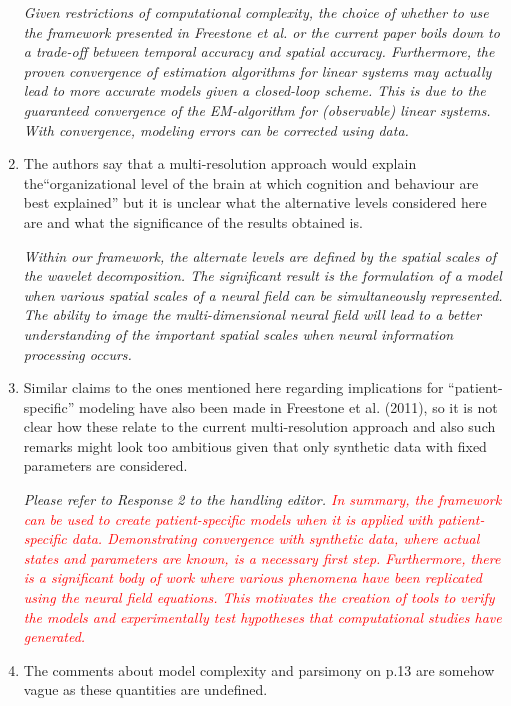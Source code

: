 \documentclass{article}
\newcommand{\dean}[1]{\textcolor{red}{#1}}
\begin{document}
\begin{enumerate}
\emph{Given restrictions of computational complexity, the choice of whether to use the framework presented in Freestone et al. or the current paper boils down to a trade-off between temporal accuracy and spatial accuracy. Furthermore, the proven convergence of estimation algorithms for linear systems may actually lead to more accurate models given a closed-loop scheme. This is due to the guaranteed convergence of the EM-algorithm for (observable) linear systems. With convergence, modeling errors can be corrected using data.}
				
        \item The authors say that a multi-resolution approach would explain the``organizational level of the brain at which cognition and behaviour are best explained'' but it is unclear what the alternative levels considered here are and what the significance of the results obtained is.

\emph{Within our framework, the alternate levels are defined by the spatial scales of the wavelet decomposition. The significant result is the formulation of a model when various spatial scales of a neural field can be simultaneously represented. The ability to image the multi-dimensional neural field will lead to a better understanding of the important spatial scales when neural information processing occurs.}

		\item Similar claims to the ones mentioned here regarding implications for ``patient-specific'' modeling have also been made in Freestone et al. (2011), so it is not clear how these relate to the current multi-resolution approach and also such remarks might look too ambitious given that only synthetic data with fixed parameters are considered.
				
	\emph{Please refer to Response 2 to the handling editor. \dean{In summary, the framework can be used to create patient-specific models when it is applied with patient-specific data. Demonstrating convergence with synthetic data, where actual states and parameters are known, is a necessary first step. Furthermore, there is a significant body of work where various phenomena have been replicated using the neural field equations. This motivates the creation of tools to verify the models and experimentally test hypotheses that computational studies have generated.    }}
				
	\item The comments about model complexity and parsimony on p.13 are somehow vague as these quantities are undefined.
				

\end{enumerate}
\end{document}
